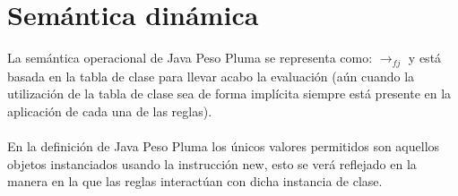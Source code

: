 \section{Semántica dinámica}
    La semántica operacional de \textsf{Java Peso Pluma} se representa como: $\rightarrow_{fj}$ y está basada en la tabla de clase para llevar acabo la evaluación (aún cuando la utilización de la tabla de clase sea de forma implícita siempre está presente en la aplicación de cada una de las reglas).\\\\
  En la definición de \textsf{Java Peso Pluma} los únicos valores permitidos son aquellos objetos instanciados usando la instrucción \textsf{new}, esto se verá reflejado en la manera en la que las reglas interactúan con dicha instancia de clase. 

    \bigskip
    
